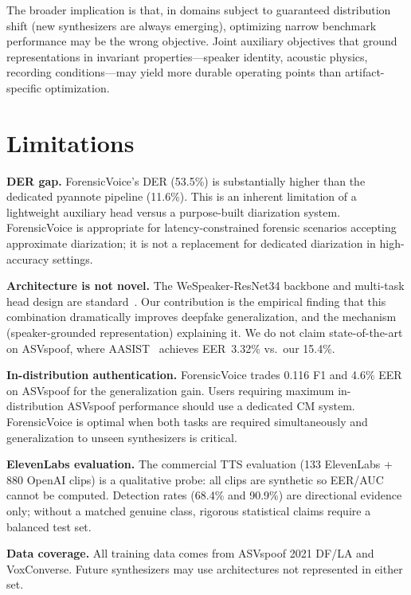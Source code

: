 \documentclass{article}
\newcommand{\fv}{ForensicVoice}
\begin{document}
The broader implication is that, in domains subject to guaranteed distribution
shift (new synthesizers are always emerging), optimizing narrow benchmark
performance may be the wrong objective. Joint auxiliary objectives that ground
representations in invariant properties---speaker identity, acoustic physics,
recording conditions---may yield more durable operating points than
artifact-specific optimization.

\section{Limitations}

\textbf{DER gap.}
\fv{}'s DER (53.5\%) is substantially higher than the dedicated pyannote
pipeline (11.6\%). This is an inherent limitation of a lightweight auxiliary
head versus a purpose-built diarization system. \fv{} is appropriate for
latency-constrained forensic scenarios accepting approximate diarization; it is
not a replacement for dedicated diarization in high-accuracy settings.

\textbf{Architecture is not novel.}
The WeSpeaker-ResNet34 backbone and multi-task head design are
standard~\citep{wang2023wespeaker,khosla2020supcon}. Our contribution is the
empirical finding that this combination dramatically improves deepfake
generalization, and the mechanism (speaker-grounded representation) explaining
it. We do not claim state-of-the-art on ASVspoof, where
AASIST~\citep{jung2022aasist} achieves EER~3.32\% vs.\ our 15.4\%.

\textbf{In-distribution authentication.}
\fv{} trades 0.116 F1 and 4.6\% EER on ASVspoof for the generalization gain.
Users requiring maximum in-distribution ASVspoof performance should use a
dedicated CM system. \fv{} is optimal when both tasks are required simultaneously
and generalization to unseen synthesizers is critical.

\textbf{ElevenLabs evaluation.}
The commercial TTS evaluation (133 ElevenLabs + 880 OpenAI clips) is a
qualitative probe: all clips are synthetic so EER/AUC cannot be computed.
Detection rates (68.4\% and 90.9\%) are directional evidence only; without a
matched genuine class, rigorous statistical claims require a balanced test set.

\textbf{Data coverage.}
All training data comes from ASVspoof 2021 DF/LA and VoxConverse. Future
synthesizers may use architectures not represented in either set.
\end{document}
